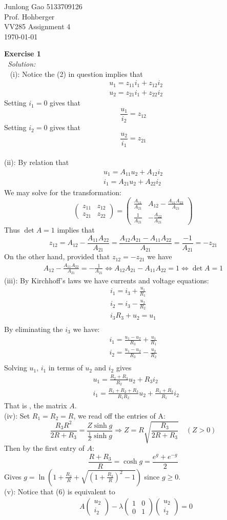 \documentclass[12pt]{article}
\def\lam{\lambda}
\def\es#1#2{{\bf Exercise #1}\\~{\it Solution:}\\~#2\\[1em]}
\def\inn#1#2{(#1): #2\\[0.5em]}
\def\ff#1#2{\frac{#1}{#2}}
\newcommand{\eq}[1]{\begin{align*}#1\end{align*}}
\newcommand{\mm}[1]{\begin{pmatrix}#1\end{pmatrix}}
\def\sq#1{\sqrt{#1}}
\begin{document}
 
\begin{flushleft}
  Junlong Gao 5133709126\\ 
  Prof.  Hohberger\\ 
  VV285 Assignment 4\\
  \today 
\end{flushleft}

\es{1}{
	\inn{i}{
	Notice the (2) in question implies that
	\eq{
	&u_1=z_{11}i_1+z_{12}i_2\\
	&u_2=z_{21}i_1+z_{22}i_2
	}
	Setting $i_1=0$ gives that
	\[
	\ff{u_1}{i_2}=z_{12}
	\]
	Setting $i_2=0$ gives that
	\[
	\ff{u_2}{i_1}=z_{21}
	\]
	}
	\inn{ii}{
	By relation that 
	\eq{
	u_1=A_{11}u_2+A_{12}i_2\\
	i_1=A_{21}u_2+A_{22}i_2
	}
	We may solve for the transformation:
	\[
	\mm{z_{11}&z_{12}\\z_{21}&z_{22}}=\mm{\ff{A_{11}}{A_{21}}&A_{12}-\ff{A_{11}A_{22}}{A_{21}}\\\ff{1}{A_{21}}&-\ff{A_{22}}{A_{21}}}
	\]
	Thus $\det A=1$ implies that 
	\[
	z_{12}=A_{12}-\ff{A_{11}A_{22}}{A_{21}}=\ff{A_{12}A_{21}-A_{11}A_{22}}{A_{21}}=\ff{-1}{A_{21}}=-z_{21}	
	\] 
	On the other hand, provided that $z_{12}=-z_{21}$ we have
	\eq{
	A_{12}-\ff{A_{11}A_{22}}{A_{21}}=-\ff{1}{A_{21}}\iff A_{12}A_{21}-A_{11}A_{22}=1 \iff \det A=1
	}
	\inn{iii}{
	By Kirchhoff's laws we have currents and voltage equations:
	\eq{
	i_1=i_3+\frac{u_1}{R_1}\\
	i_2=i_3-\frac{u_2}{R_2}\\
	i_3R_3+u_2=u_1\\
	}
	By eliminating the $i_3$ we have:
	\eq{
	i_1=\frac{u_1-u_2}{R_3}+\frac{u_1}{R_1}\\
	i_2=\frac{u_1-u_2}{R_3}-\frac{u_2}{R_2}\\
	}
	Solving $u_1$, $i_1$ in terms of $u_2$ and $i_2$ gives 
	\eq{
	&u_1=\frac{R_2+R_3}{R_2}u_2+R_3i_2\\
	&i_1=\frac{R_1+R_2+R_3}{R_1R_2}u_2+\frac{R_1+R_3}{R_1}i_2
	}
	That is , the matrix $A$.
	}
	\inn{iv}{
	Set $R_1=R_2=R$, we read off the entries of A:
	\[
	\ff{R_3R^2}{2R+R_3}=\ff{Z\sinh g}{\ff{1}{Z}\sinh g}\Longrightarrow Z=R\sq{\ff{R_3}{2R+R_3}}\quad(Z>0)
	\]
	Then by the first entry of $A$:
	\[
	\frac{R+R_3}{R}=\cosh g=\frac{e^g+e^{-g}}{2}
	\]
	Gives $g=\ln\left(1+\frac{R_3}{R}+\sqrt{\left(1+\frac{R_3}{R}\right)^2-1}\right)$ since $g\ge0$.
	}
	\inn{v}{
	Notice that (6) is equivalent to
	\eq{
	&A\mm{u_2\\i_2}-\lam\mm{1&0\\0&1}\mm{u_2\\i_2}=0\\
}}}}
\end{document}
